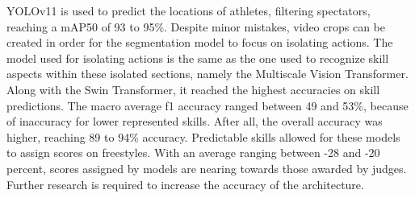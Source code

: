 YOLOv11 is used to predict the locations of athletes, filtering spectators, reaching a mAP50 of 93 to 95\%. Despite minor mistakes, video crops can be created in order for the segmentation model to focus on isolating actions. The model used for isolating actions is the same as the one used to recognize skill aspects within these isolated sections, namely the Multiscale Vision Transformer. Along with the Swin Transformer, it reached the highest accuracies on skill predictions. The macro average f1 accuracy ranged between 49 and 53\%, because of inaccuracy for lower represented skills. After all, the overall accuracy was higher, reaching 89 to 94\% accuracy. Predictable skills allowed for these models to assign scores on freestyles. With an average ranging between -28 and -20 percent, scores assigned by models are nearing towards those awarded by judges.
Further research is required to increase the accuracy of the architecture. 

